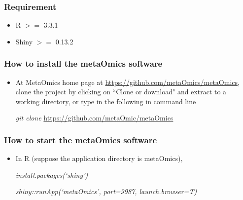 \subsubsection{Requirement}
\begin{itemize}
\item R $>=$ 3.3.1
\item Shiny $>=$ 0.13.2
\end{itemize}

\subsubsection{How to install the metaOmics software}
\begin{itemize}
\item At MetaOmics home page at \url{https://github.com/metaOmics/metaOmics}, clone the project by
clicking on ``Clone or download" and extract to a working directory, 
or type in the following in command line

\textit{git clone} \url{https://github.com/metaOmic/metaOmics}
\end{itemize}

\subsubsection{How to start the metaOmics software}
\begin{itemize}
\item In R (suppose the application directory is metaOmics),

\textit{install.packages(`shiny')}

\textit{shiny::runApp(`metaOmics', port=9987, launch.browser=T)}
\end{itemize}

